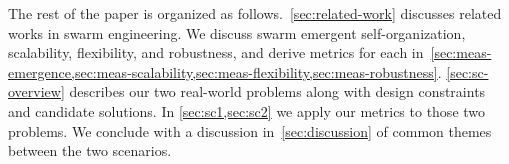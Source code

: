 %
The rest of the paper is organized as follows.~\cref{sec:related-work} discusses
related works in swarm engineering. We discuss swarm emergent self-organization,
scalability, flexibility, and robustness, and derive metrics for each
in~\cref{sec:meas-emergence,sec:meas-scalability,sec:meas-flexibility,sec:meas-robustness}.
\cref{sec:sc-overview} describes our two real-world problems along with design
constraints and candidate solutions. In \cref{sec:sc1,sec:sc2} we apply our
metrics to those two problems. We conclude with a discussion
in~\cref{sec:discussion} of common themes between the two scenarios.




